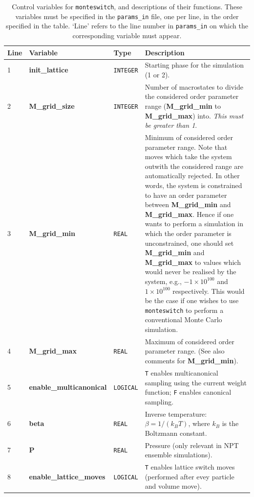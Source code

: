 \documentclass{report}
\begin{document}
\begin{landscape}
\begin{center}\label{table:params_in_variables}
\begin{longtable}{l l l p{8cm}}
\caption{Control variables for \texttt{monteswitch}, and descriptions of their functions. These variables must be specified in the \texttt{params\_in} file, 
one per line, in the order specified in the table. `Line' refers to the line number in \texttt{params\_in} on which the corresponding variable must appear.}
\\

Line & Variable & Type & Description \\
\hline
1 & \textbf{init\_lattice}  &  \texttt{INTEGER}  & Starting phase for the simulation (1 or 2). \\
2 & \textbf{M\_grid\_size}  &  \texttt{INTEGER}  & Number of macrostates to divide the considered order parameter range (\textbf{M\_grid\_min} to 
\textbf{M\_grid\_max}) into. \emph{This must be greater than 1}. \\
3 & \textbf{M\_grid\_min}  &  \texttt{REAL}  & Minimum of considered order parameter range. Note that moves which take the system outwith the considered 
range are automatically rejected. In other words, the system is constrained to have an order parameter between \textbf{M\_grid\_min} and 
\textbf{M\_grid\_max}. Hence
if one wants to perform a simulation in which the order parameter is unconstrained, one should set \textbf{M\_grid\_min} and \textbf{M\_grid\_max} to
values which would never be realised by the system, e.g., $-1\times 10^{100}$ and $1\times 10^{100}$ respectively. This would be the case if one wishes
to use \texttt{monteswitch} to perform a conventional Monte Carlo simulation. \\
4 & \textbf{M\_grid\_max}  &  \texttt{REAL}  & Maximum of considered order parameter range. (See also comments for \textbf{M\_grid\_min}).  \\
5 & \textbf{enable\_multicanonical}  &  \texttt{LOGICAL}  & \texttt{T} enables multicanonical sampling using the current weight function; \texttt{F} 
enables canonical sampling. \\
6 & \textbf{beta}  &  \texttt{REAL}  & Inverse temperature: $\beta=1/(k_BT)$, where $k_B$ is the Boltzmann constant.  \\
7 & \textbf{P}  &  \texttt{REAL}  & Pressure (only relevant in NPT ensemble simulations).  \\
8 & \textbf{enable\_lattice\_moves}  &  \texttt{LOGICAL}  & \texttt{T} enables lattice switch moves (performed after evey particle and volume move). \\

\end{longtable}
\end{center}
\end{landscape}
\end{document}
